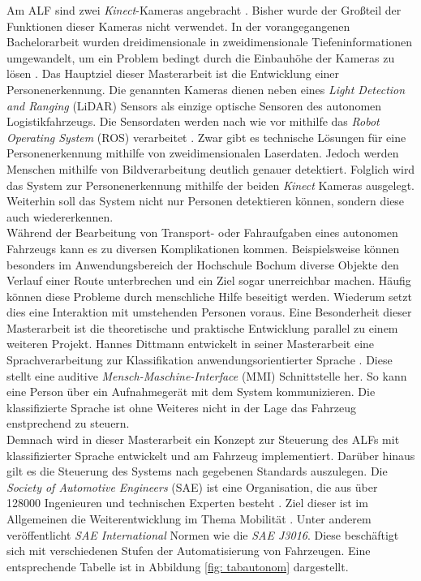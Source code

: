 		Am ALF sind zwei \textit{Kinect}-Kameras angebracht \cite{Bachelorarbeit}. Bisher wurde der Großteil der Funktionen dieser Kameras nicht verwendet. In der vorangegangenen Bachelorarbeit wurden dreidimensionale in zweidimensionale Tiefeninformationen umgewandelt, um ein Problem bedingt durch die Einbauhöhe der Kameras zu lösen \cite{Bachelorarbeit}. Das Hauptziel dieser Masterarbeit ist die Entwicklung einer Personenerkennung. Die genannten Kameras dienen neben eines \textit{Light Detection and Ranging} (LiDAR) Sensors als einzige optische Sensoren des autonomen Logistikfahrzeugs. Die Sensordaten werden nach wie vor mithilfe das \textit{Robot Operating System} (ROS) verarbeitet \cite{Bachelorarbeit}. Zwar gibt es technische Lösungen für eine Personenerkennung mithilfe von zweidimensionalen Laserdaten. Jedoch werden Menschen mithilfe von Bildverarbeitung deutlich genauer detektiert. Folglich wird das System zur Personenerkennung mithilfe der beiden \textit{Kinect} Kameras ausgelegt. Weiterhin soll das System nicht nur Personen detektieren können, sondern diese auch wiedererkennen. \\
		
		Während der Bearbeitung von Transport- oder Fahraufgaben eines autonomen Fahrzeugs kann es zu diversen Komplikationen kommen. Beispielsweise können besonders im Anwendungsbereich der Hochschule Bochum diverse Objekte den Verlauf einer Route unterbrechen und ein Ziel sogar unerreichbar machen. Häufig können diese Probleme durch menschliche Hilfe beseitigt werden. Wiederum setzt dies eine Interaktion mit umstehenden Personen voraus. Eine Besonderheit dieser Masterarbeit ist die theoretische und praktische Entwicklung parallel zu einem weiteren Projekt. Hannes Dittmann entwickelt in seiner Masterarbeit eine Sprachverarbeitung zur Klassifikation anwendungsorientierter Sprache \cite{Dittmann}. Diese stellt eine auditive \textit{Mensch-Maschine-Interface} (MMI) Schnittstelle her. So kann eine Person über ein Aufnahmegerät mit dem System kommunizieren. Die klassifizierte Sprache ist ohne Weiteres nicht in der Lage das Fahrzeug enstprechend zu steuern.\\
		
		Demnach wird in dieser Masterarbeit ein Konzept zur Steuerung des ALFs mit klassifizierter Sprache entwickelt und am Fahrzeug implementiert. Darüber hinaus gilt es die Steuerung des Systems nach gegebenen Standards auszulegen. Die \textit{Society of Automotive Engineers} (SAE) ist eine Organisation, die aus über 128000 Ingenieuren und technischen Experten besteht \cite{saeorg}. Ziel dieser ist im Allgemeinen die Weiterentwicklung im Thema Mobilität \cite{saeorg}. Unter anderem veröffentlicht \textit{SAE International} Normen wie die \textit{SAE J3016}. Diese beschäftigt sich mit verschiedenen Stufen der Automatisierung von Fahrzeugen. Eine entsprechende Tabelle ist in Abbildung \ref{fig: tabautonom} dargestellt.\\
		
